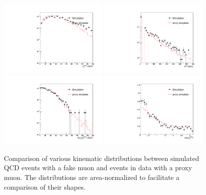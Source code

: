 \documentclass[thesis.tex]{subfiles}
\renewcommand\_{\textunderscore\allowbreak}
\begin{document}
\begin{figure}[hbtp]\begin{center}
    \includegraphics[width=0.475\textwidth]{Figures/faketemp_muon_met.pdf}
    \includegraphics[width=0.475\textwidth]{Figures/faketemp_muon_ht.pdf}
    \includegraphics[width=0.475\textwidth]{Figures/faketemp_muon_mt.pdf}
    \includegraphics[width=0.475\textwidth]{Figures/faketemp_muon_dPhi.pdf}
    \caption{Comparison of various kinematic distributions between simulated
        QCD events with a fake muon and events in data with a proxy muon. The
        distributions are area-normalized to facilitate a comparison of their
        shapes.}
        \label{fig:c_muon}
\end{center}\end{figure}
\end{document}
